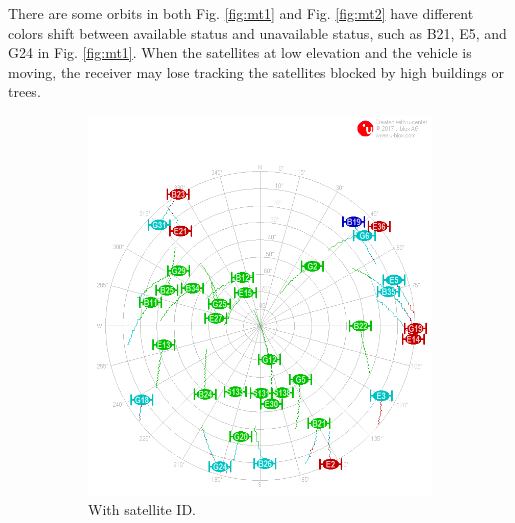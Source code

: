 \documentclass[letterpaper, 10 pt,onecolumn]{article}
\begin{document}
	There are some orbits in both Fig. \ref{fig:mt1} and Fig. \ref{fig:mt2} have different colors shift between available status and unavailable status, such as B21, E5, and G24 in Fig. \ref{fig:mt1}. When the satellites at low elevation and the vehicle is moving, the receiver may lose tracking the satellites blocked by high buildings or trees. 
	\begin{figure}[H]
		\centering
		\begin{subfigure}{.45\textwidth}
			\includegraphics[width=\linewidth]{../Moving_SingleBand/skyplot.png}
			\caption{With satellite ID.}
			\label{fig:mt1_sky}
		\end{subfigure}%
		\begin{subfigure}{.45\textwidth}

\end{subfigure}
\end{figure}
\end{document}
